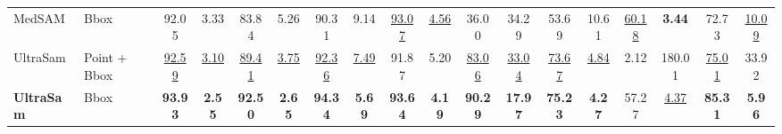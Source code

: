 \begin{table}
{\begin{tabular}{l|l|cccccccccccccc|cc}
MedSAM~\cite{ma2024medsam} & Bbox & 92.05 & 3.33 & 83.84 & 5.26 & 90.31 & 9.14 & \underline{93.07} & \underline{4.56} & 36.00 & 34.29 & 53.69 & 10.61 & \underline{60.18} & \textbf{3.44} & 72.73 & \underline{10.09} \\
UltraSam~\cite{meyer2025ultrasam} & Point + Bbox & \underline{92.59} & \underline{3.10} & \underline{89.41} & \underline{3.75} & \underline{92.36} & \underline{7.49} & 91.87 & 5.20 & \underline{83.06} & \underline{33.04} & \underline{73.67} & \underline{4.84} & 2.12 & 180.01 & \underline{75.01} & 33.92 \\
\textbf{UltraSam~\cite{meyer2025ultrasam}} & Bbox & \textbf{93.93} & \textbf{2.55} & \textbf{92.50} & \textbf{2.65} & \textbf{94.34} & \textbf{5.69} & \textbf{93.64} & \textbf{4.19} & \textbf{90.29} & \textbf{17.97} & \textbf{75.23} & \textbf{4.27} & 57.27 & \underline{4.37} & \textbf{85.31} & \textbf{5.96} \\
\bottomrule
\end{tabular}%
}
\end{table}
